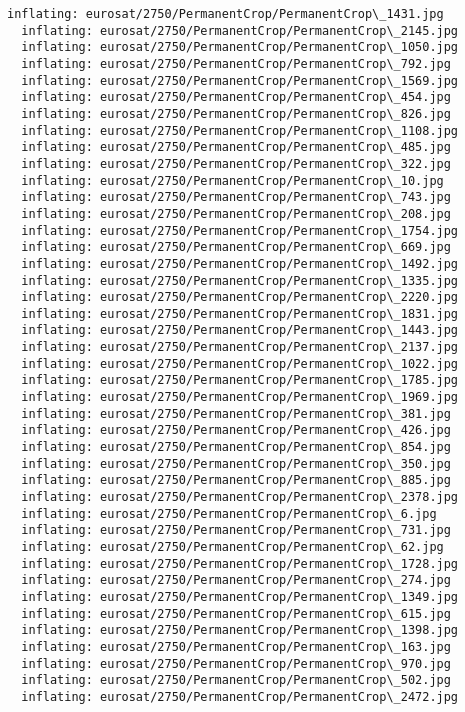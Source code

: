 \documentclass[11pt]{article}
\begin{document}
\begin{Verbatim}[commandchars=\\\{\}]
  inflating: eurosat/2750/PermanentCrop/PermanentCrop\_1431.jpg
  inflating: eurosat/2750/PermanentCrop/PermanentCrop\_2145.jpg
  inflating: eurosat/2750/PermanentCrop/PermanentCrop\_1050.jpg
  inflating: eurosat/2750/PermanentCrop/PermanentCrop\_792.jpg
  inflating: eurosat/2750/PermanentCrop/PermanentCrop\_1569.jpg
  inflating: eurosat/2750/PermanentCrop/PermanentCrop\_454.jpg
  inflating: eurosat/2750/PermanentCrop/PermanentCrop\_826.jpg
  inflating: eurosat/2750/PermanentCrop/PermanentCrop\_1108.jpg
  inflating: eurosat/2750/PermanentCrop/PermanentCrop\_485.jpg
  inflating: eurosat/2750/PermanentCrop/PermanentCrop\_322.jpg
  inflating: eurosat/2750/PermanentCrop/PermanentCrop\_10.jpg
  inflating: eurosat/2750/PermanentCrop/PermanentCrop\_743.jpg
  inflating: eurosat/2750/PermanentCrop/PermanentCrop\_208.jpg
  inflating: eurosat/2750/PermanentCrop/PermanentCrop\_1754.jpg
  inflating: eurosat/2750/PermanentCrop/PermanentCrop\_669.jpg
  inflating: eurosat/2750/PermanentCrop/PermanentCrop\_1492.jpg
  inflating: eurosat/2750/PermanentCrop/PermanentCrop\_1335.jpg
  inflating: eurosat/2750/PermanentCrop/PermanentCrop\_2220.jpg
  inflating: eurosat/2750/PermanentCrop/PermanentCrop\_1831.jpg
  inflating: eurosat/2750/PermanentCrop/PermanentCrop\_1443.jpg
  inflating: eurosat/2750/PermanentCrop/PermanentCrop\_2137.jpg
  inflating: eurosat/2750/PermanentCrop/PermanentCrop\_1022.jpg
  inflating: eurosat/2750/PermanentCrop/PermanentCrop\_1785.jpg
  inflating: eurosat/2750/PermanentCrop/PermanentCrop\_1969.jpg
  inflating: eurosat/2750/PermanentCrop/PermanentCrop\_381.jpg
  inflating: eurosat/2750/PermanentCrop/PermanentCrop\_426.jpg
  inflating: eurosat/2750/PermanentCrop/PermanentCrop\_854.jpg
  inflating: eurosat/2750/PermanentCrop/PermanentCrop\_350.jpg
  inflating: eurosat/2750/PermanentCrop/PermanentCrop\_885.jpg
  inflating: eurosat/2750/PermanentCrop/PermanentCrop\_2378.jpg
  inflating: eurosat/2750/PermanentCrop/PermanentCrop\_6.jpg
  inflating: eurosat/2750/PermanentCrop/PermanentCrop\_731.jpg
  inflating: eurosat/2750/PermanentCrop/PermanentCrop\_62.jpg
  inflating: eurosat/2750/PermanentCrop/PermanentCrop\_1728.jpg
  inflating: eurosat/2750/PermanentCrop/PermanentCrop\_274.jpg
  inflating: eurosat/2750/PermanentCrop/PermanentCrop\_1349.jpg
  inflating: eurosat/2750/PermanentCrop/PermanentCrop\_615.jpg
  inflating: eurosat/2750/PermanentCrop/PermanentCrop\_1398.jpg
  inflating: eurosat/2750/PermanentCrop/PermanentCrop\_163.jpg
  inflating: eurosat/2750/PermanentCrop/PermanentCrop\_970.jpg
  inflating: eurosat/2750/PermanentCrop/PermanentCrop\_502.jpg
  inflating: eurosat/2750/PermanentCrop/PermanentCrop\_2472.jpg

\end{Verbatim}
\end{document}
